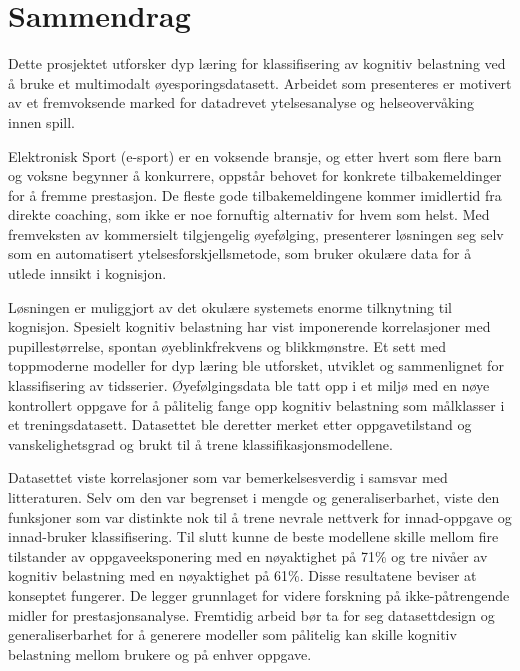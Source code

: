 \chapter*{Sammendrag}

Dette prosjektet utforsker dyp læring for klassifisering av kognitiv belastning ved å bruke et multimodalt øyesporingsdatasett. Arbeidet som presenteres er motivert av et fremvoksende marked for datadrevet ytelsesanalyse og helseovervåking innen spill.

Elektronisk Sport (e-sport) er en voksende bransje, og etter hvert som flere barn og voksne begynner å konkurrere, oppstår behovet for konkrete tilbakemeldi\-nger for å fremme prestasjon. De fleste gode tilbakemeldingene kommer imidlertid fra direkte coaching, som ikke er noe fornuftig alternativ for hvem som helst. Med fremveksten av kommersielt tilgjengelig øyefølging, presenterer løsningen seg selv som en automatisert ytelsesforskjellsmetode, som bruker okulære data for å utlede innsikt i kognisjon.

Løsningen er muliggjort av det okulære systemets enorme tilknytning til kognisjon. Spesielt kognitiv belastning har vist imponerende korrelasjoner med pupill\-estørrelse, spontan øyeblinkfrekvens og blikkmønstre. Et sett med toppmoderne modeller for dyp læring ble utforsket, utviklet og sammenlignet for klassifisering av tidsserier. Øyefølgingsdata ble tatt opp i et miljø med en nøye kontrollert oppgave for å pålitelig fange opp kognitiv belastning som målklasser i et treningsdatasett. Datasettet ble deretter merket etter oppgavetilstand og vanskelighetsgrad og brukt til å trene klassifikasjonsmodellene.

Datasettet viste korrelasjoner som var bemerkelsesverdig i samsvar med litteraturen. Selv om den var begrenset i mengde og generaliserbarhet, viste den funksjoner som var distinkte nok til å trene nevrale nettverk for innad-oppgave og innad-bruker klassifisering. Til slutt kunne de beste modellene skille mellom fire tilstander av oppgaveeksponering med en nøyaktighet på 71\% og tre nivåer av kognitiv belastning med en nøyaktighet på 61\%. Disse resultatene beviser at konseptet fungerer. De legger grunnlaget for videre forskning på ikke-påtrengende midler for prestasjonsanalyse. Fremtidig arbeid bør ta for seg datasettdesign og generaliserbarhet for å generere modeller som pålitelig kan skille kognitiv belastning mellom brukere og på enhver oppgave.